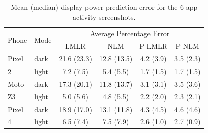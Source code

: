 \begin{table}[tp]
\begin{center}
\centering
\caption{Mean (median) display power prediction error for the 6 app activity screenshots.}
\vspace{-0.1in}
{ \footnotesize
    \begin{tabular}{|p{7mm}|p{6mm}|c|c|c|c|}
    	\hline
    	       \multirow{2}{*}{Phone} & \multirow{2}{*}{Mode} & \multicolumn{4}{c|}{Average Percentage Error} \\
    	\cline{3-6}
    	        &   & LMLR & NLM & P-LMLR & P-NLM\\
    	\hline
    	Pixel & dark   & 21.6 (23.3) & 12.8 (13.5) & 4.2 (3.9) & 3.5 (2.3) \\ %
    	    2 & light  & 7.2 (7.5) & 5.4 (5.5) & 1.7 (1.5) & 1.7 (1.5) \\
    	\hline
    	Moto  & dark   & 17.3 (20.1) & 11.8 (13.7) & 3.1 (3.1) & 3.5 (3.6) \\ %
           Z3 & light  & 5.0 (5.6) & 4.8 (5.5) & 2.2 (2.0) & 2.3 (2.1) \\
    	\hline
        Pixel & dark   & 18.9 (17.0) & 13.1 (11.8) & 4.3 (4.5) & 4.6 (4.6) \\ %
            4 & light  & 6.5 (7.4) & 7.5 (7.9) & 2.6 (1.0) & 2.7 (0.9) \\
    	\hline
    \end{tabular}
}
\label{tab:100_images}
\end{center}
\vspace{-0.2in}
\end{table}

